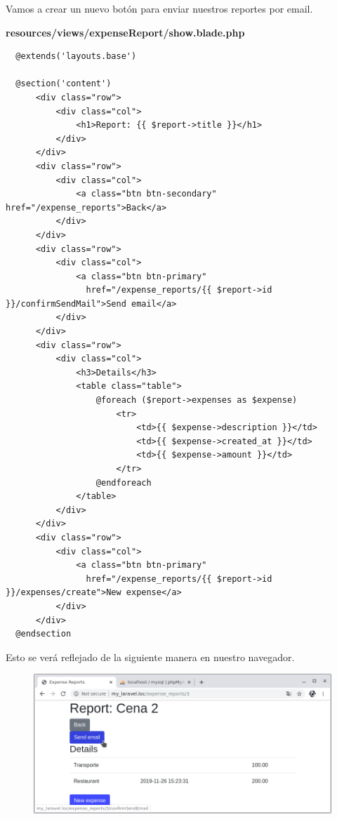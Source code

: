 \documentclass{article}
\begin{document}
Vamos a crear un nuevo botón para enviar nuestros reportes por email.

\textbf{resources/views/expenseReport/show.blade.php}
\begin{verbatim}
  @extends('layouts.base')

  @section('content')
      <div class="row">
          <div class="col">
              <h1>Report: {{ $report->title }}</h1>
          </div>
      </div>
      <div class="row">
          <div class="col">
              <a class="btn btn-secondary" href="/expense_reports">Back</a>
          </div>
      </div>
      <div class="row">
          <div class="col">
              <a class="btn btn-primary"
                href="/expense_reports/{{ $report->id }}/confirmSendMail">Send email</a>
          </div>
      </div>
      <div class="row">
          <div class="col">
              <h3>Details</h3>
              <table class="table">
                  @foreach ($report->expenses as $expense)
                      <tr>
                          <td>{{ $expense->description }}</td>
                          <td>{{ $expense->created_at }}</td>
                          <td>{{ $expense->amount }}</td>
                      </tr>
                  @endforeach
              </table>
          </div>
      </div>
      <div class="row">
          <div class="col">
              <a class="btn btn-primary"
                href="/expense_reports/{{ $report->id }}/expenses/create">New expense</a>
          </div>
      </div>
  @endsection
\end{verbatim}

Esto se verá reflejado de la siguiente manera en nuestro navegador.

\newpage

\begin{figure}[h!]
  \centering
  \includegraphics[scale=0.5]{./Pictures/119_send_email.png}
\end{figure}
\end{document}
